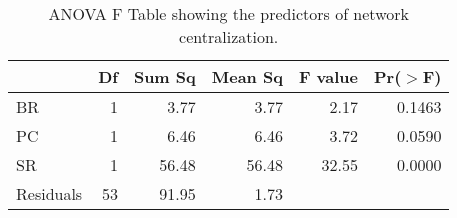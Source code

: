 \begin{table}[ht]
\centering
\begin{tabular}{lrrrrr}
  \hline
 & Df & Sum Sq & Mean Sq & F value & Pr($>$F) \\ 
  \hline
BR & 1 & 3.77 & 3.77 & 2.17 & 0.1463 \\ 
  PC & 1 & 6.46 & 6.46 & 3.72 & 0.0590 \\ 
  SR & 1 & 56.48 & 56.48 & 32.55 & 0.0000 \\ 
  Residuals & 53 & 91.95 & 1.73 &  &  \\ 
   \hline
\end{tabular}
\caption{ANOVA F Table showing the predictors of network centralization.} 
\label{tab:cen_aov}
\end{table}
